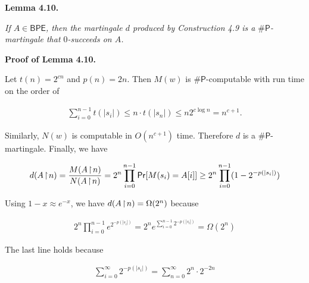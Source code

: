 

\par\medskip\noindent\textbf{
\textbf{Lemma 4.10}\textbf{.}
}\par



\emph{If $A\in\mathsf{BPE}$, then the martingale $d$ produced by Construction 4.9 is a ${\mathsf{\#}\mathsf{P}}$-martingale that $0$-succeeds on $A$.}\par






\par\medskip\noindent\textbf{Proof of Lemma 4.10.}\par




Let $t(n)=2^{cn}$ and $p(n)=2n$. Then
$M(w)$ is ${\mathsf{\#}\mathsf{P}}$-computable with run time on the order of\par


\[\begin{gathered}
\sum_{i=0}^{n-1}t(|s_{i}|)\leq n\cdot t(|s_{n}|)\leq n2^{c\log n}=n^{c+1}.
\end{gathered}\]


Similarly,
$N(w)$ is computable in $O(n^{c+1})$ time. Therefore $d$ is a ${\mathsf{\#}\mathsf{P}}$-martingale.
Finally, we have\par


\[\begin{gathered}
d(A\negthinspace\upharpoonright\negthinspace n)=\frac{M(A\negthinspace\upharpoonright\negthinspace n)}{N(A\negthinspace\upharpoonright\negthinspace n)}=2^{n}\prod_{i=0}^{n-1}\mathsf{Pr}[M(s_{i})=A[i]]\geq 2^{n}\prod_{i=0}^{n-1}(1-2^{-p(|s_{i}|)})
\end{gathered}\]


Using $1-x\approx e^{-x}$, we have $d(A\negthinspace\upharpoonright\negthinspace n)=\Omega(2^{n})$ because\par


\[\begin{gathered}
2^{n}\prod_{i=0}^{n-1}e^{2^{-p(|s_{i}|)}}=2^{n}e^{\sum\limits_{i=0}^{n-1}2^{-p(|s_{i}|)}}=\Omega(2^{n})
\end{gathered}\]


The last line holds because\par


\[\begin{gathered}
\sum_{i=0}^{\infty}2^{-p(|s_{i}|)}=\sum_{n=0}^{\infty}2^{n}\cdot 2^{-2n}
\end{gathered}\]


